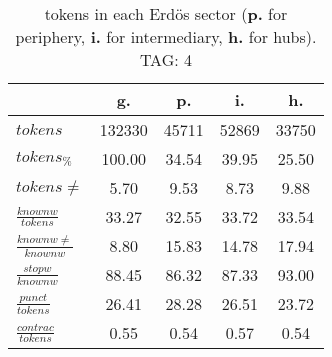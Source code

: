 \begin{table}[h!]
\begin{center}
\begin{tabular}{| l | c | c | c | c |}\hline
 & g. & p. & i. & h. \\\hline
$tokens$ & 132330  & 45711  & 52869  & 33750 \\\hline
$tokens_{\%}$ & 100.00  & 34.54  & 39.95  & 25.50 \\\hline
$tokens \neq$ & 5.70  & 9.53  & 8.73  & 9.88 \\\hline
$\frac{knownw}{tokens}$ & 33.27  & 32.55  & 33.72  & 33.54 \\\hline
$\frac{knownw \neq}{knownw}$ & 8.80  & 15.83  & 14.78  & 17.94 \\\hline
$\frac{stopw}{knownw}$ & 88.45  & 86.32  & 87.33  & 93.00 \\\hline
$\frac{punct}{tokens}$ & 26.41  & 28.28  & 26.51  & 23.72 \\\hline
$\frac{contrac}{tokens}$ & 0.55  & 0.54  & 0.57  & 0.54 \\\hline
\end{tabular}
\caption{tokens in each Erd\"os sector ({{\bf p.}} for periphery, {{\bf i.}} for intermediary, 
    {{\bf h.}} for hubs). TAG: 4}
\end{center}
\end{table}